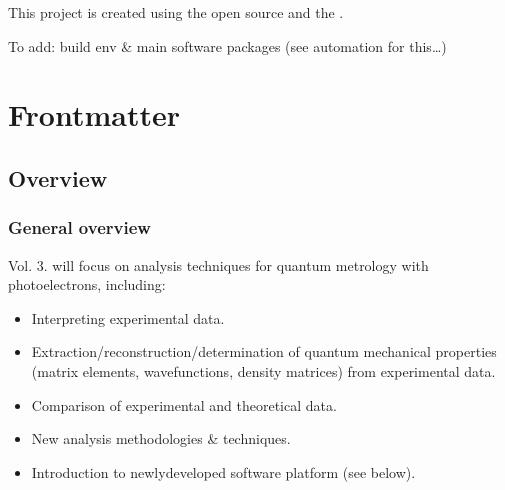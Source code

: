 \documentclass[letterpaper,table,10pt,english]{jupyterBook}
\begin{document}
\begin{DUlineblock}{0em}
\item[] 
\end{DUlineblock}

\sphinxAtStartPar
This project is created using the open source  and the .

\sphinxAtStartPar
To add: build env \& main software packages (see automation for this…)

\sphinxAtStartPar
{}

\sphinxstepscope


\part{Frontmatter}

\sphinxstepscope


\chapter{Overview}
\label{\detokenize{frontmatter/overview_270122:overview}}\label{\detokenize{frontmatter/overview_270122::doc}}

\section{General overview}
\label{\detokenize{frontmatter/overview_270122:general-overview}}
\sphinxAtStartPar
Vol. 3. will focus on analysis techniques for quantum metrology with photoelectrons, including:
\begin{itemize}
\item {} 
\sphinxAtStartPar
Interpreting experimental data.

\item {} 
\sphinxAtStartPar
Extraction/reconstruction/determination of quantum mechanical properties (matrix elements, wavefunctions, density matrices) from experimental data.

\item {} 
\sphinxAtStartPar
Comparison of experimental and theoretical data.

\item {} 
\sphinxAtStartPar
New analysis methodologies \& techniques.

\item {} 
\sphinxAtStartPar
Introduction to newly\sphinxhyphen{}developed software platform (see below).

\end{itemize}
\end{document}
